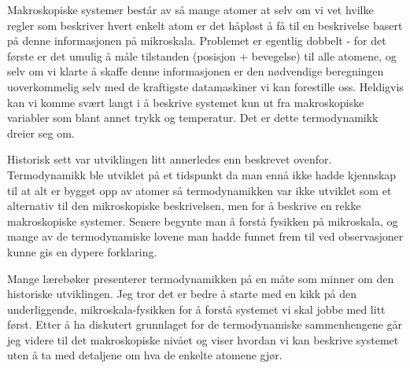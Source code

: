 \documentclass[a4paper,norsk,12pt]{book}
\begin{document}
\tableofcontents

\pagebreak
Makroskopiske systemer består av så mange atomer at selv om vi vet hvilke regler som beskriver hvert enkelt atom er det håpløst å få til en beskrivelse basert på denne informasjonen på mikroskala. Problemet er egentlig dobbelt - for det første er det umulig å måle tilstanden (posisjon + bevegelse) til alle atomene, og selv om vi klarte å skaffe denne informasjonen er den nødvendige beregningen uoverkommelig selv med de kraftigste datamaskiner vi kan forestille oss. Heldigvis kan vi komme svært langt i å beskrive systemet kun ut fra makroskopiske variabler som blant annet trykk og temperatur. Det er dette termodynamikk dreier seg om.

Historisk sett var utviklingen litt annerledes enn beskrevet ovenfor. Termodynamikk ble utviklet på et tidspunkt da man ennå ikke hadde kjennskap til at alt er bygget opp av atomer så termodynamikken var ikke utviklet som et alternativ til den mikroskopiske beskrivelsen, men for å beskrive en rekke makroskopiske systemer. Senere begynte man å forstå fysikken på mikroskala, og mange av de termodynamiske lovene man hadde funnet frem til ved observasjoner kunne gis en dypere forklaring.

Mange lærebøker presenterer termodynamikken på en måte som minner om den historiske utviklingen. Jeg tror det er bedre å starte med en kikk på den underliggende, mikroskala-fysikken for å forstå systemet vi skal jobbe med litt først. Etter å ha diskutert grunnlaget for de termodynamiske sammenhengene går jeg videre til det makroskopiske nivået og viser hvordan vi kan beskrive systemet uten å ta med detaljene om hva de enkelte atomene gjør.







\appendix

\end{document}
